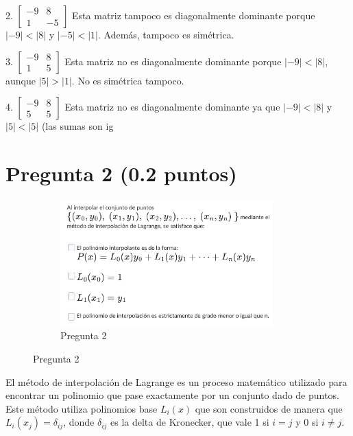 2. \(\begin{bmatrix}-9 & 8\\ 1 & -5\end{bmatrix}\)
Esta matriz tampoco es diagonalmente dominante porque \( |-9| < |8| \) y \( |-5| < |1| \). Además, tampoco es simétrica.

3. \(\begin{bmatrix}-9 & 8\\ 1 & 5\end{bmatrix}\)
Esta matriz no es diagonalmente dominante porque \( |-9| < |8| \), aunque \( |5| > |1| \). No es simétrica tampoco.

4. \(\begin{bmatrix}-9 & 8\\ 5 & 5\end{bmatrix}\)
Esta matriz no es diagonalmente dominante ya que \( |-9| < |8| \) y \( |5| < |5| \) (las sumas son ig

\section{Pregunta 2 (0.2 puntos)}

\begin{figure}[H]
    \centering
    \begin{subfigure}[b]{0.9\textwidth}
        \centering
        \includegraphics[width=0.9\textwidth]{Figures/0. General/2.png}
        \caption{Pregunta 2}
        \label{fig: pregunta 2}
    \end{subfigure}
\end{figure}

El método de interpolación de Lagrange es un proceso matemático utilizado para encontrar un polinomio que pase exactamente por un conjunto dado de puntos. Este método utiliza polinomios base \(L_i(x)\) que son construidos de manera que \(L_i(x_j) = \delta_{ij}\), donde \(\delta_{ij}\) es la delta de Kronecker, que vale 1 si \(i = j\) y 0 si \(i \neq j\).

